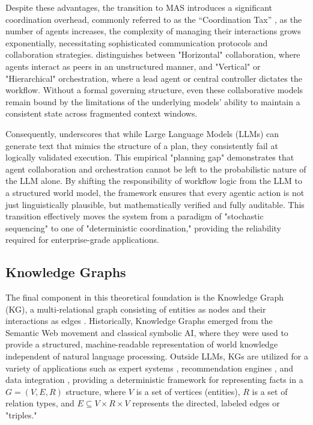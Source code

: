 Despite these advantages, the transition to MAS introduces a significant coordination overhead, commonly referred to as the “Coordination Tax” \citep{kim2025sciencescalingagentsystems}, as the number of agents increases, the complexity of managing their interactions grows exponentially, necessitating sophisticated communication protocols and collaboration strategies. 
\citet{wang2025largemodelbasedagents} distinguishes between "Horizontal" collaboration, where agents interact as peers in an unstructured manner, and "Vertical" or "Hierarchical" orchestration, where a lead agent or central controller dictates the workflow. Without a formal governing structure, even these collaborative models remain bound by the limitations of the underlying models' ability to maintain a consistent state across fragmented context windows.

Consequently, \citet{valmeekam2023planbenchextensiblebenchmarkevaluating} underscores that while Large Language Models (LLMs) can generate text that mimics the structure of a plan, they consistently fail at logically validated execution. This empirical "planning gap" demonstrates that agent collaboration and orchestration cannot be left to the probabilistic nature of the LLM alone. By shifting the responsibility of workflow logic from the LLM to a structured world model, the framework ensures that every agentic action is not just linguistically plausible, but mathematically verified and fully auditable. This transition effectively moves the system from a paradigm of "stochastic sequencing" to one of "deterministic coordination," providing the reliability required for enterprise-grade applications.

\subsection{Knowledge Graphs}

The final component in this theoretical foundation is the Knowledge Graph (KG), a multi-relational graph consisting of entities as nodes and their interactions as edges \citep{Hogan_2021}. 
Historically, Knowledge Graphs emerged from the Semantic Web movement and classical symbolic AI, where they were used to provide a structured, machine-readable representation of world knowledge independent of natural language processing. 
Outside LLMs, KGs are utilized for a variety of applications such as expert systems \citep{jiang2025evolutionknowledgegraphssurvey}, recommendation engines \citep{catherine2016personalized}, and data integration \citep{noy2019industry}, providing a deterministic framework for representing facts in a $G = (V, E, R)$ structure, where $V$ is a set of vertices (entities), $R$ is a set of relation types, and $E \subseteq V \times R \times V$ represents the directed, labeled edges or "triples."

